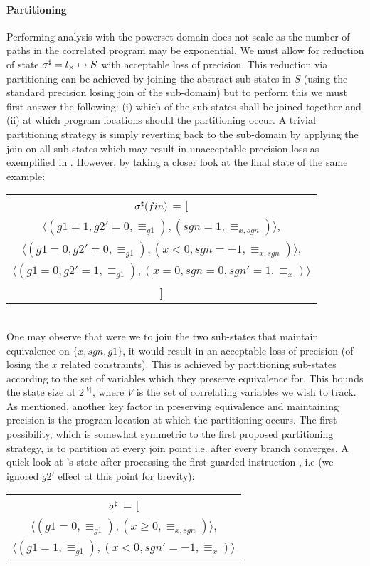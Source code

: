 \paragraph{Partitioning}
Performing analysis with the powerset domain does not scale as the number of paths in the correlated program may be exponential. We must allow for reduction of state $\sigma^\sharp = l_{\times} \mapsto S$ with acceptable loss of precision. This reduction via partitioning can be achieved by joining the abstract sub-states in $S$ (using the standard precision losing join of the sub-domain) but to perform this we must first answer the following: (i) which of the sub-states shall be joined together and (ii) at which program locations should the partitioning occur. A trivial partitioning strategy is simply reverting back to the sub-domain by applying the join on all sub-states which may result in unacceptable precision loss as exemplified in . However, by taking a closer look at the final state of the same example:
\\
\begin{tabular}{c}
$\sigma^\sharp(fin)$ = [
\\
$\langle (g1=1,g2'=0,\equiv_{g1}),(sgn=1,\equiv_{x,sgn}) \rangle$,
\\
$\langle (g1=0,g2'=0,\equiv_{g1}), (x<0,sgn=-1,\equiv_{x,sgn}) \rangle$,
\\
$\langle (g1=0,g2'=1,\equiv_{g1}),(x=0,sgn=0,sgn'=1,\equiv_{x}) \rangle$
\\
]
\end{tabular}
\\
One may observe that were we to join the two sub-states that maintain equivalence on $\{x,sgn,g1\}$, it would result in an acceptable loss of precision (of losing the $x$ related constraints). This is achieved by partitioning sub-states according to the set of variables which they preserve equivalence for. This bounds the state size at $2^{|V|}$, where $V$ is the set of correlating variables we wish to track.
As mentioned, another key factor in preserving equivalence and maintaining precision is the program location at which the partitioning occurs. The first possibility, which is somewhat symmetric to the first proposed partitioning strategy, is to partition at every join point i.e. after every branch converges. A quick look at 's state after processing the first guarded instruction , i.e (we ignored $g2'$ effect at this point for brevity):
\\
\begin{tabular}{c}
$\sigma^\sharp$ = [
\\
$\langle (g1=0,\equiv_{g1}),(x \geq 0,\equiv_{x,sgn}) \rangle$,
\\
$\langle (g1=1,\equiv_{g1}),(x < 0,sgn' = -1, \equiv_{x}) \rangle$
\\
\end{tabular}
